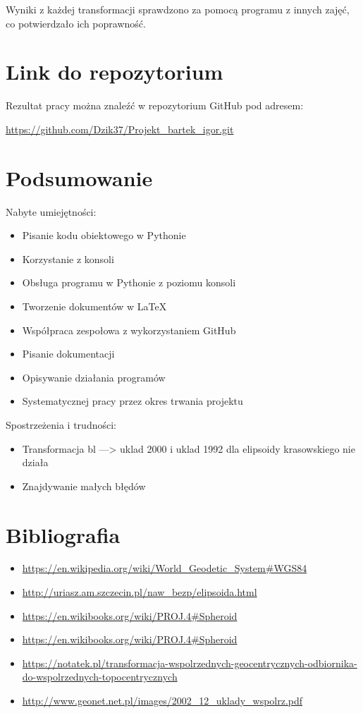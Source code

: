 \documentclass[11pt, a4paper]{article}
\begin{document}
	 Wyniki z każdej transformacji sprawdzono za pomocą programu z innych zajęć, co potwierdzało ich poprawność.
	
	\section{Link do repozytorium}
	Rezultat pracy można znaleźć w repozytorium GitHub pod adresem:
	
	 \url{https://github.com/Dzik37/Projekt_bartek_igor.git}
	
	\section{Podsumowanie}
	Nabyte umiejętności:
	\begin{itemize}
		\item Pisanie kodu obiektowego w Pythonie
		\item Korzystanie z konsoli 
		\item Obsługa programu w Pythonie z poziomu konsoli
		\item Tworzenie dokumentów w LaTeX
		\item Współpraca zespołowa z wykorzystaniem GitHub
		\item Pisanie dokumentacji
		\item Opisywanie działania programów 
		\item Systematycznej pracy przez okres trwania projektu
	\end{itemize}
	
	Spostrzeżenia i trudności:
	\begin{itemize}
		\item Transformacja bl ---> uklad 2000 i uklad 1992 dla elipsoidy krasowskiego nie działa
		\item Znajdywanie małych błędów
		
	\end{itemize}
	
	\section{Bibliografia}
	
	\begin{itemize}
		\item \url{https://en.wikipedia.org/wiki/World_Geodetic_System#WGS84}
		\item \url{http://uriasz.am.szczecin.pl/naw_bezp/elipsoida.html}
		\item \url{https://en.wikibooks.org/wiki/PROJ.4#Spheroid}
		\item \url{https://en.wikibooks.org/wiki/PROJ.4#Spheroid}
		\item \url{https://notatek.pl/transformacja-wspolrzednych-geocentrycznych-odbiornika-do-wspolrzednych-topocentrycznych}
		\item \url{http://www.geonet.net.pl/images/2002_12_uklady_wspolrz.pdf}
	\end{itemize}
	
	
\end{document}
